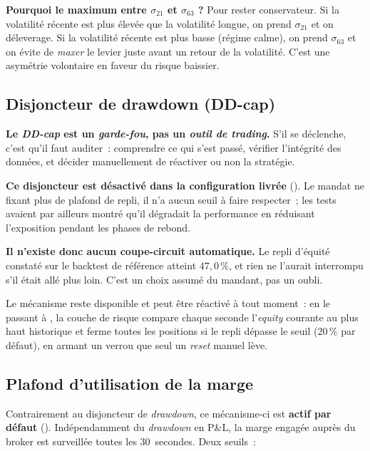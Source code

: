 \documentclass[11pt, a4paper]{scrartcl}
\begin{document}
\begin{insightbox}
\textbf{Pourquoi le maximum entre $\sigma_{21}$ et $\sigma_{63}$ ?} Pour rester
conservateur. Si la volatilité récente est plus élevée que la volatilité longue,
on prend $\sigma_{21}$ et on déleverage. Si la volatilité récente est plus basse
(régime calme), on prend $\sigma_{63}$ et on évite de \emph{maxer} le levier
juste avant un retour de la volatilité. C'est une asymétrie volontaire en
faveur du risque baissier.
\end{insightbox}

\subsection{Disjoncteur de drawdown (DD-cap)}

\begin{warningbox}
\textbf{Le \emph{DD-cap} est un \emph{garde-fou}, pas un \emph{outil de trading}.}
S'il se déclenche, c'est qu'il faut auditer~: comprendre ce qui s'est passé,
vérifier l'intégrité des données, et décider manuellement de réactiver ou non
la stratégie.
\end{warningbox}

\textbf{Ce disjoncteur est désactivé dans la configuration livrée} (). Le mandat ne fixant plus de plafond de repli, il n'a aucun seuil à faire respecter~; les tests avaient par ailleurs montré qu'il dégradait la performance en réduisant l'exposition pendant les phases de rebond.

\textbf{Il n'existe donc aucun coupe-circuit automatique.} Le repli d'équité constaté sur le backtest de référence atteint $47{,}0\,\%$, et rien ne l'aurait interrompu s'il était allé plus loin. C'est un choix assumé du mandant, pas un oubli.

Le mécanisme reste disponible et peut être réactivé à tout moment~: en le passant à , la couche de risque compare chaque seconde l'\emph{equity} courante au plus haut historique et ferme toutes les positions si le repli dépasse le seuil  ($20\,\%$ par défaut), en armant un verrou que seul un \emph{reset} manuel lève.

\subsection{Plafond d'utilisation de la marge}
\label{sec:margin_cap}

Contrairement au disjoncteur de \emph{drawdown}, ce mécanisme-ci est \textbf{actif par défaut} (). Indépendamment du \emph{drawdown} en P\&L, la marge engagée auprès du broker est surveillée toutes les 30~secondes. Deux seuils~:
\end{document}
